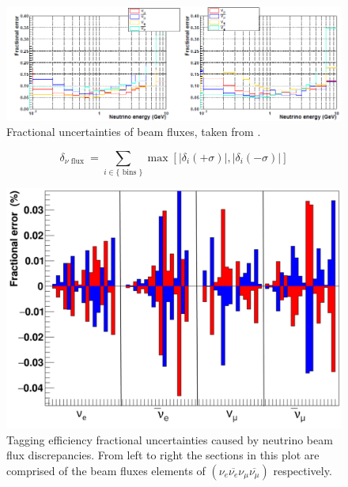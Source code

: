 \begin{figure}[!htb]
    \includegraphics[width=\textwidth]{Figures/frac_beam_flux_uncertainty.png}
    \caption{Fractional uncertainties of beam fluxes, taken from \cite{tn415_fiacob}. }
    \label{fig:frac_beam_flux_uncertainty}
\end{figure}


\begin{equation}
    \delta_{\nu \text { flux }}=\sum_{i \in\{\text { bins }\}} \max \left[\left|\delta_{i}(+\sigma)\right|,\left|\delta_{i}(-\sigma)\right|\right]
 \label{eq:summingfluxuncertainty}   
\end{equation}

\begin{figure}[!htb]
    \centering
\includegraphics[width=\textwidth]{Figures/flux_uncertainty.png}
\caption{Tagging efficiency fractional uncertainties caused by neutrino beam flux discrepancies. From left to right the sections in this plot are comprised of the beam fluxes elements of $\left(\nu_{e} \overline{\nu_{e}} \nu_{\mu} \overline{\nu_{\mu}}\right)$ respectively.}
\label{fig:fluxuncertainty}
\end{figure}

